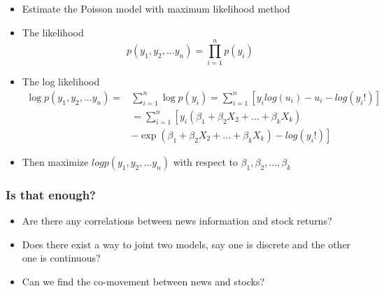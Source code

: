 \documentclass{beamer}
\begin{document}
\begin{frame}[allowframebreaks]
\begin{itemize}
\begin{itemize}
    \end{itemize}
  \item Estimate the Poisson model with maximum likelihood method
  \item The likelihood
    \begin{equation*}
      p(y_1,y_2,...y_n) = \prod \limits_{i=1}^np(y_i)
    \end{equation*}
  \item The log likelihood
    \begin{equation*}
      \begin{split}
        \log p(y_1,y_2,...y_n) =& \sum \limits_{i=1}^n \log p(y_i) = \sum
        \limits_{i=1}^n  \left[y_i log(u_i) -u_i -log(y_i!)\right]\\
        & = \sum \limits_{i=1}^n  \left[ y_i (\beta_1 + \beta_2X_2
          +...+\beta_kX_k) \right.\\
        &\left.-\exp(\beta_1 + \beta_2X_2 +...+\beta_kX_k) -log(y_i!)\right]
      \end{split}
    \end{equation*}
  \item Then maximize $log p(y_1,y_2,...y_n)$ with respect to $\beta_1,\beta_2,...,\beta_k$


  \end{itemize}

\end{frame}


\begin{frame}
  \frametitle{Is that enough?}

  \begin{itemize}
  \item Are there any correlations between news information and stock returns?
  \item Does there exist a way to joint two models, say one is discrete and the other one
    is continuous?

  \item Can we find the co-movement between news and stocks?
  \end{itemize}

\end{frame}
\end{document}
